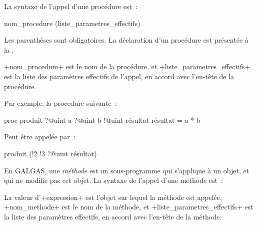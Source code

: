 %
















La syntaxe de l'appel d'une procédure est~:
\begin{galgasbox}
nom_procedure (liste_parametres_effectifs)
\end{galgasbox}

Les parenthèses sont obligatoires. La déclaration d'un procédure est présentée à la .

\ggs+nom_procedure+ est le nom de la procédure, et \ggs+liste_parametres_effectifs+ est la liste des paramètres effectifs de l'appel, en accord avec l'en-tête de la procédure.

Par exemple, la procedure suivante~:
\begin{galgas}
proc produit ?@uint a ?@uint b !@uint résultat {
  résultat = a * b
}
\end{galgas}

Peut être appelée par~:
\begin{galgas}
produit (!2 !3 ?@uint résultat)
\end{galgas}
















En GALGAS, une \emph{méthode} est un sous-programme qui s'applique à un objet, et qui ne modifie pas cet objet. La syntaxe de l'appel d'une méthode est~:
\begin{galgas}
\end{galgas}

La valeur d'\ggs+expression+ est l'objet sur lequel la méthode est appelée, \ggs+nom_methode+ est le nom de la méthode, et \ggs+liste_parametres_effectifs+ est la liste des paramètres effectifs, en accord avec l'en-tête de la méthode.


